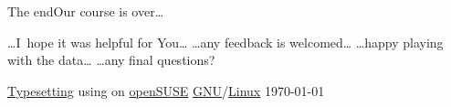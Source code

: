 \documentclass[compress,  xelatex, 11pt, xcolor=x11names, aspectratio=169,
	hyperref={
		bookmarks=true,
		unicode=true,
		colorlinks=true,
		pdftitle={HybSeq course},
		plainpages=false,
		pdfauthor={Vojtech Zeisek},
		pdfsubject={Practical processing of HybSeq target enrichment sequencing data on computing grids like MetaCentrum},
		pdfcreator={XeLaTeX},
		pdfkeywords={BASH, command line, GNU, HybSeq, Linux, MetaCentrum, sequencing shell, target enrichment},
		linkcolor=Turquoise4, %
		anchorcolor=DodgerBlue4, %
		citecolor=DodgerBlue4, %
		filecolor=DodgerBlue4, %
		menucolor=Tan4, %
		urlcolor=DarkOliveGreen4 %
		},
	url={hyphens, lowtilde} %
	]{beamer}
\begin{document}
\begin{frame}{The end}{Our course is over\ldots}
	\begin{center}
		\ldots I~hope it was helpful for You\ldots
		\vfill
		\ldots any feedback is welcomed\ldots
		\vfill
		\ldots happy playing with the data\ldots
		\vfill
		\ldots any final questions?
		\vfill
	\end{center}
	\vfill
	\begin{flushright}
		\begin{tiny}
		\href{https://en.wikipedia.org/wiki/XeTeX}{Typesetting} using \XeLaTeX{ }on \href{https://www.opensuse.org/}{openSUSE} \href{https://en.wikipedia.org/wiki/GNU}{GNU}/\href{https://en.wikipedia.org/wiki/Linux}{Linux} \today
		\end{tiny}
	\end{flushright}
\end{frame}
\end{document}
